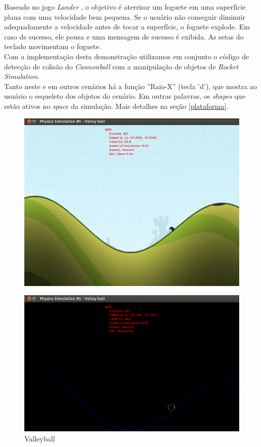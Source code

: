 Baseado no jogo \textit{Lander} \cite{lander}, o objetivo é aterrisar um foguete em uma superfície plana com uma velocidade bem pequena. Se o usuário não conseguir diminuir adequadamente a velocidade antes de tocar a superfície, o foguete explode. Em caso de sucesso, ele pousa e uma mensagem de sucesso é exibida. As setas do teclado movimentam o foguete. \\

Com a implementação desta demonstração utilizamos em conjunto o código de detecção de colisão do \textit{Cannonball} com a manipulação de objetos de \textit{Rocket Simulation}. \\

Tanto neste e em outros cenários há a função ''Raio-X'' (tecla 'd'), que mostra ao usuário o esqueleto dos objetos do cenário. Em outras palavras, os \textit{shapes} que estão ativos no \textit{space} da simulação. Mais detalhes na seção \ref{plataforma}.

\begin{figure}[H]
\centering
  \includegraphics[scale=0.4]{images/valleyball.png}
\end{figure}
\begin{figure}[H]
\centering
  \includegraphics[scale=0.4]{images/valleyballE.png}
  \caption{Valleyball}
\end{figure}

